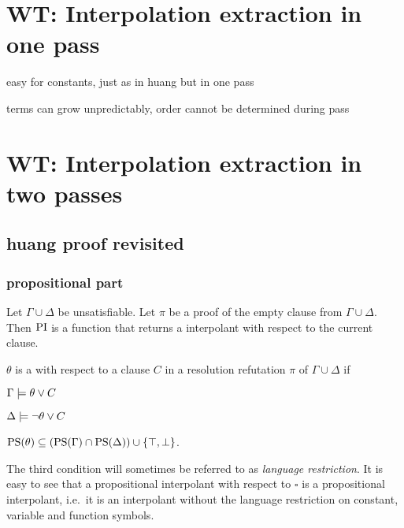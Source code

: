 
\section{WT: Interpolation extraction in one pass}

easy for constants, just as in huang but in one pass

terms can grow unpredictably, order cannot be determined during pass

\section{WT: Interpolation extraction in two passes}

\subsection{huang proof revisited}

\subsubsection{propositional part}

Let $\Gamma \cup \Delta$ be unsatisfiable. Let $\pi$ be a proof of the empty clause from $\Gamma \cup \Delta$. Then $\operatorname{PI}$ is a function that returns a interpolant with respect to the current clause. 

\begin{defi}
	$\theta$ is a  with respect to a clause $C$ in a resolution refutation $\pi$ of $\Gamma \cup \Delta$ if 
	\label{def:rel_prop_interpol}
	\begin{compactenum}
		\item $\Gamma \models \theta \lor C$
			\label{rel_prop_interpol_cond1}
		\item $\Delta \models \lnot \theta \lor C$
			\label{rel_prop_interpol_cond2}
		\item $\operatorname{PS}(\theta) \subseteq (\operatorname{PS}(\Gamma) \cap \operatorname{PS}(\Delta)) \cup \{\top, \bot\} $.
			\label{rel_prop_interpol_cond_lang}
			\qedhere
	\end{compactenum}
\end{defi}

The third condition will sometimes be referred to as \emph{language restriction}.
It is easy to see that a propositional interpolant with respect to $\square$ is a propositional interpolant, i.e.~it is an interpolant without the language restriction on constant, variable and function symbols.

